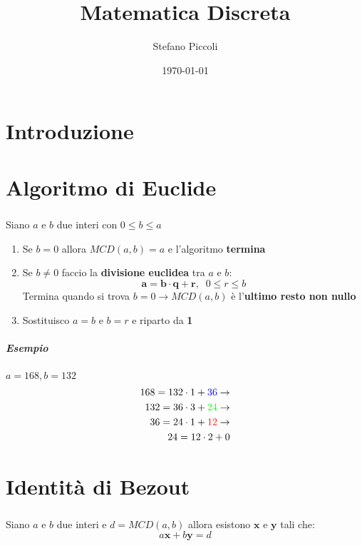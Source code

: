 \documentclass[a4paper, 12pt]{report}
\begin{document}
\title{
\textbf{Matematica Discreta}}
\author{Stefano Piccoli}
\date{\today}
\maketitle
\tableofcontents
	\chapter*{Introduzione}
    \chapter{Algoritmo di Euclide}
    \paragraph{}Siano $a$ e $b$ due interi con $0 \leq b \leq a$
    \begin{enumerate}
        \item Se $b=0$ allora $MCD(a,b)=a$ e l'algoritmo \textbf{termina}
        \item Se $b\neq 0$ faccio la \textbf{divisione euclidea} tra $a$ e $b$:$$\boldsymbol{a=b \cdot q + r}, \; \; 0 \leq r \leq b$$
            \subitem Termina quando si trova $b=0 \rightarrow MCD(a,b)$ è l'\textbf{ultimo resto non nullo}
        \item Sostituisco $a=b$ e $b=r$ e riparto da \textbf{1}         
    \end{enumerate}
    \paragraph{Esempio} $a=168, b=132$
    \begin{align*}
        168=132\cdot 1+\textcolor{blue}{36} \rightarrow\\
        132=36 \cdot 3 +\textcolor{green}{24} \rightarrow\\
        36=24 \cdot 1+\textcolor{red}{12} \rightarrow\\
        24=12\cdot 2+0
    \end{align*}
    

    \chapter{Identità di Bezout}
    \paragraph{}Siano $a$ e $b$ due interi e $d=MCD(a,b)$ allora esistono $\boldsymbol{x}$ e $\boldsymbol{y}$ tali che:$$a\boldsymbol{x}+b\boldsymbol{y}=d$$
\end{document}
